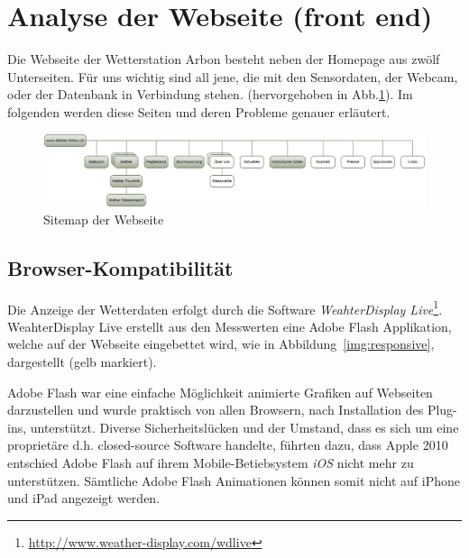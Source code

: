 \section{Analyse der Webseite (front end)}

Die Webseite der Wetterstation Arbon besteht neben der Homepage aus zwölf Unterseiten. Für uns wichtig sind all jene, die mit den Sensordaten, der Webcam, oder der Datenbank in Verbindung stehen. (hervorgehoben in Abb.\ref{img:sitemap}). Im folgenden werden diese Seiten und deren Probleme genauer erläutert.

\begin{figure}[h!]
	\centering
	\includegraphics[width=0.9\linewidth]{img/sitemap2}
	\caption{Sitemap der Webseite}
	\label{img:sitemap}
\end{figure}


\subsection{Browser-Kompatibilität}
\label{subsec:flash}
Die Anzeige der Wetterdaten erfolgt durch die Software \textit{WeahterDisplay Live}\footnote{ \url{http://www.weather-display.com/wdlive}}. WeahterDisplay Live erstellt aus den Messwerten eine Adobe Flash Applikation, welche auf der Webseite eingebettet wird, wie in Abbildung~\ref{img:responsive}, dargestellt (gelb markiert).
\newline


\noindent
Adobe Flash war eine einfache Möglichkeit animierte Grafiken auf Webseiten darzustellen und wurde praktisch von allen Browsern, nach Installation des Plug-ins, unterstützt. Diverse Sicherheitslücken und der Umstand, dass es sich um eine proprietäre d.h. closed-source Software handelte, führten dazu, dass Apple 2010 entschied Adobe Flash auf ihrem Mobile-Betiebsystem \textit{iOS} nicht mehr zu unterstützen\cite{Apple:ThoughtsOnFlash}. Sämtliche Adobe Flash Animationen können somit nicht auf iPhone und iPad angezeigt werden.

